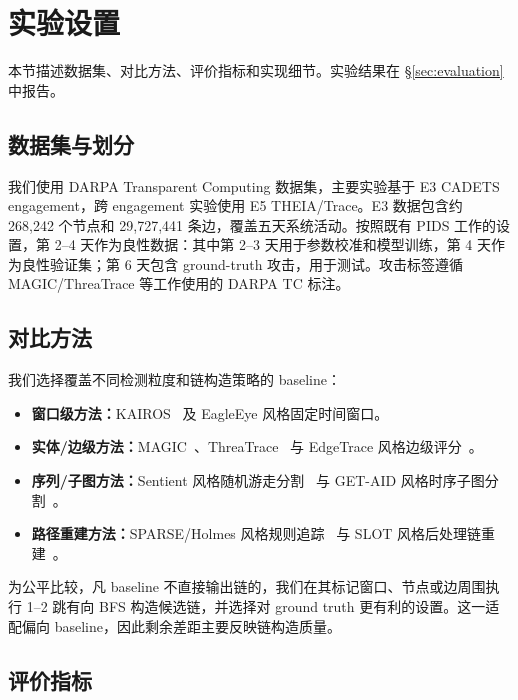 \section{实验设置}
\label{sec:setup}

本节描述数据集、对比方法、评价指标和实现细节。实验结果在 \S\ref{sec:evaluation} 中报告。

\subsection{数据集与划分}

我们使用 DARPA Transparent Computing 数据集，主要实验基于 E3 CADETS engagement，跨 engagement 实验使用 E5 THEIA/Trace。E3 数据包含约 268{,}242 个节点和 29{,}727{,}441 条边，覆盖五天系统活动。按照既有 PIDS 工作的设置，第 2--4 天作为良性数据：其中第 2--3 天用于参数校准和模型训练，第 4 天作为良性验证集；第 6 天包含 ground-truth 攻击，用于测试。攻击标签遵循 MAGIC/ThreaTrace 等工作使用的 DARPA TC 标注。

\subsection{对比方法}

我们选择覆盖不同检测粒度和链构造策略的 baseline：
\begin{itemize}
\item \textbf{窗口级方法：}KAIROS~\cite{cheng2024kairos} 及 EagleEye 风格固定时间窗口。
\item \textbf{实体/边级方法：}MAGIC~\cite{jia2024magic}、ThreaTrace~\cite{wang2022threatrace} 与 EdgeTrace 风格边级评分~\cite{edgetrace2025}。
\item \textbf{序列/子图方法：}Sentient 风格随机游走分割~\cite{sentient2026} 与 GET-AID 风格时序子图分割~\cite{getaid2025}。
\item \textbf{路径重建方法：}SPARSE/Holmes 风格规则追踪~\cite{sparse2024,holmes2019} 与 SLOT 风格后处理链重建~\cite{slot2025}。
\end{itemize}

为公平比较，凡 baseline 不直接输出链的，我们在其标记窗口、节点或边周围执行 1--2 跳有向 BFS 构造候选链，并选择对 ground truth 更有利的设置。这一适配偏向 baseline，因此剩余差距主要反映链构造质量。

\subsection{评价指标}
\label{sec:eval:metrics}

